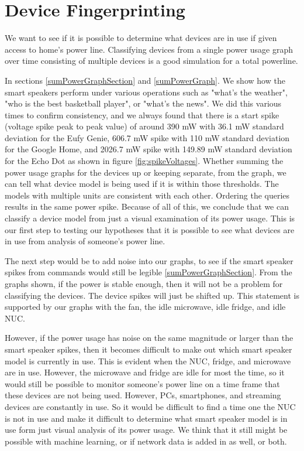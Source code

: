 \section{Device Fingerprinting}
We want to see if it is possible to determine what devices are in use if given access to home's power line. Classifying devices from a single power usage graph over time consisting of multiple devices is a good simulation for a total powerline.

In sections \ref{sumPowerGraphSection} and \ref{sumPowerGraph}. We show how the smart speakers perform under various operations such as "what's the weather", "who is the best basketball player", or "what's the news". We did this various times to confirm consistency, and we always found that there is a start spike (voltage spike peak to peak value) of around 390 mW with 36.1 mW standard deviation for the Eufy Genie, 606.7 mW spike with 110 mW standard deviation for the Google Home, and 2026.7 mW spike with 149.89 mW standard deviation for the Echo Dot as shown in figure \ref{fig:spikeVoltages}. Whether summing the power usage graphs for the devices up or keeping separate, from the graph, we can tell what device model is being used if it is within those thresholds. The models with multiple units are consistent with each other. Ordering the queries results in the same power spike. Because of all of this, we conclude that we can classify a device model from just a visual examination of its power usage. This is our first step to testing our hypotheses that it is possible to see what devices are in use from analysis of someone's power line.

The next step would be to add noise into our graphs, to see if the smart speaker spikes from commands would still be legible \ref{sumPowerGraphSection}. From the graphs shown, if the power is stable enough, then it will not be a problem for classifying the devices. The device spikes will just be shifted up. This statement is supported by our graphs with the fan, the idle microwave, idle fridge, and idle NUC.

However, if the power usage has noise on the same magnitude or larger than the smart speaker spikes, then it becomes difficult to make out which smart speaker model is currently in use. This is evident when the NUC, fridge, and microwave are in use. However, the microwave and fridge are idle for most the time, so it would still be possible to monitor someone's power line on a time frame that these devices are not being used. However, PCs, smartphones, and streaming devices are constantly in use. So it would be difficult to find a time one the NUC is not in use and make it difficult to determine what smart speaker model is in use form just visual analysis of its power usage. We think that it still might be possible with machine learning, or if network data is added in as well, or both.

